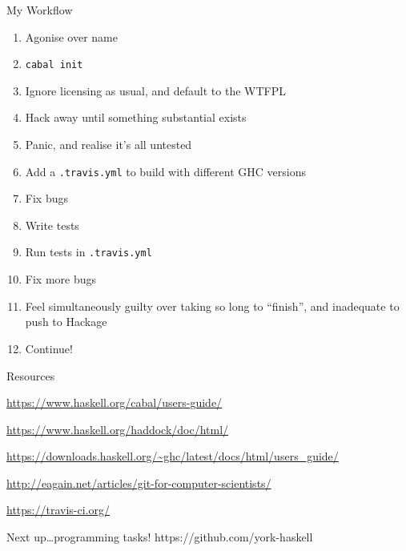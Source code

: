 \documentclass[20pt]{beamer}
\begin{document}
\begin{frame}{My Workflow}
  \begin{enumerate}
  \item Agonise over name
  \item \texttt{cabal init}
  \item Ignore licensing as usual, and default to the WTFPL
  \item Hack away until something substantial exists
  \item Panic, and realise it's all untested
  \item Add a \texttt{.travis.yml} to build with different GHC
    versions
  \item Fix bugs
  \item Write tests
  \item Run tests in \texttt{.travis.yml}
  \item Fix more bugs
  \item Feel simultaneously guilty over taking so long to ``finish'',
    and inadequate to push to Hackage
  \item Continue!
  \end{enumerate}
\end{frame}

\begin{frame}{Resources}
  \begin{center}
  \url{https://www.haskell.org/cabal/users-guide/}

  \vspace{2cm}

  \url{https://www.haskell.org/haddock/doc/html/}

  \vspace{2cm}

  \url{https://downloads.haskell.org/~ghc/latest/docs/html/users\_guide/}

  \vspace{2cm}

  \url{http://eagain.net/articles/git-for-computer-scientists/}

  \vspace{2cm}

  \url{https://travis-ci.org/}
  \end{center}
\end{frame}

\begin{frame}
  \begin{center}
    \Huge
    Next up\ldots programming tasks!
    https://github.com/york-haskell
  \end{center}
\end{frame}
\end{document}
